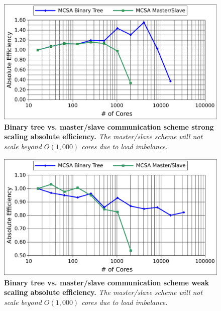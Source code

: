 \begin{figure}[t!]
  \begin{center}
    \includegraphics[width=6in]{chapters/parallel_mc/titan_strong_bvsm.pdf}
  \end{center}
  \caption{\textbf{Binary tree vs. master/slave communication scheme
      strong scaling absolute efficiency.} \textit{The master/slave
      scheme will not scale beyond $O(1,000)$ cores due to load
      imbalance.}}
  \label{fig:titan_strong_bvsm}
\end{figure}

\clearpage

\begin{figure}[t!]
  \begin{center}
    \includegraphics[width=6in]{chapters/parallel_mc/titan_weak_bvsm.pdf}
  \end{center}
  \caption{\textbf{Binary tree vs. master/slave communication scheme
      weak scaling absolute efficiency.}  \textit{The master/slave
      scheme will not scale beyond $O(1,000)$ cores due to load
      imbalance.}}
  \label{fig:titan_weak_bvsm}
\end{figure}

